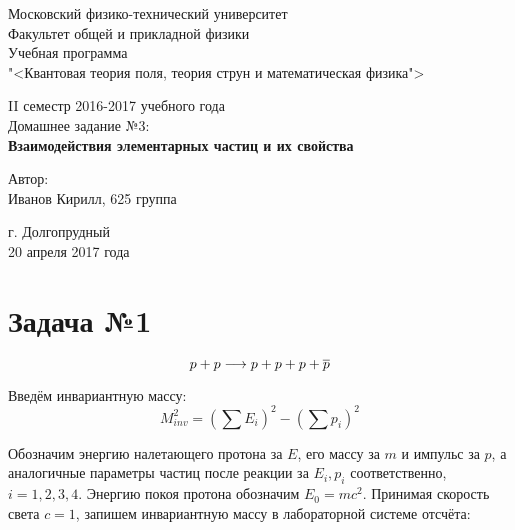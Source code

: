 \documentclass[12pt]{urticle}
\newcommand{\ov}{\ensuremath{\overline}}
\newcommand{\st}{\ensuremath{\longrightarrow}}
\begin{document}
	
\begin{titlepage}		
\begin{center}
\large 	Московский физико-технический университет \\
Факультет общей и прикладной физики \\
\vspace{0.2cm}
Учебная программа\\
"<Квантовая теория поля, теория струн и математическая физика">

\vspace{4.5cm}
II семестр 2016-2017 учебного года \\ \vspace{0.1cm}
\large Домашнее задание №3: \\ \vspace{0.1cm}
\LARGE \textbf{Взаимодействия элементарных частиц и их свойства}
\end{center}
\vspace{2.3cm} \large

\begin{center}
		 Автор: \\
 Иванов Кирилл,
 625 группа
\vspace{10mm}


\end{center}

\begin{center} \vspace{50mm}
г. Долгопрудный \\ 
20 апреля 2017 года
\end{center}
\end{titlepage}

\section{Задача №1}

\begin{equation}
 p + p \st p + p + p + \ov{p}
\end{equation}

Введём инвариантную массу:
\begin{equation}
M_{inv}^2  = \left(\sum E_i\right)^2 - \left(\sum p_i\right)^2
\end{equation}

Обозначим энергию налетающего протона за $ E  $,  его массу за $ m $ и импульс за $ p $, а аналогичные параметры частиц после реакции за $ E_i, p_i $ соответственно, $ i = 1, 2, 3, 4. $ Энергию покоя протона обозначим $ E_0 = mc^2 $.
Принимая скорость света $ c = 1 $, запишем инвариантную массу в лабораторной системе отсчёта:
\end{document}
